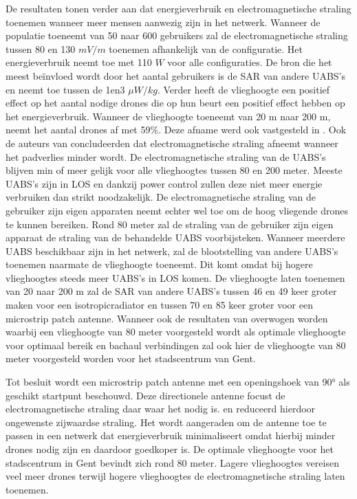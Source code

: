 \documentclass[twocolumn]{phdsymp_dutch}
\begin{document}
De resultaten tonen verder aan dat energieverbruik en electromagnetische straling toenemen wanneer 
meer mensen aanwezig zijn in het netwerk. Wanneer de populatie toeneemt van 50 naar 600 gebruikers 
zal de electromagnetische straling tussen 80 en 130 $mV/m$ toenemen afhankelijk van de configuratie.
Het energieverbruik neemt toe met 110 $W$ voor alle configuraties.
De bron die het meest be\"invloed wordt  door het aantal gebruikers is de \gls{SAR} van andere \gls{UABS}'s 
en neemt toe tussen de 1en3 $\mu W/kg$. 
Verder heeft de vlieghoogte een positief effect op het aantal nodige drones die op hun beurt een positief 
effect hebben op het energieverbruik. Wanneer de vlieghoogte toeneemt van 20 m naar 200 m, neemt het aantal 
drones af met 59\%. Deze afname werd ook vastgesteld in \cite{J2}.
Ook de auteurs van \cite{J17_kuehn2019modelling} concludeerden dat electromagnetische straling afneemt wanneer 
het padverlies minder wordt.
De electromagnetische straling van de  \gls{UABS}'s blijven min of meer gelijk voor alle vlieghoogtes tussen 80 en 200 meter. 
Meeste \gls{UABS}'s zijn in \gls{LOS} en dankzij power control zullen deze niet meer energie verbruiken dan strikt noodzakelijk.
De electromagnetische straling van de gebruiker zijn eigen apparaten neemt echter wel toe om de hoog vliegende drones te kunnen bereiken.
Rond 80 meter zal de straling van de gebruiker zijn eigen apparaat de straling van de behandelde \gls{UABS} voorbijsteken.
Wanneer meerdere \gls{UABS} beschikbaar zijn in het netwerk, zal de blootstelling van andere \gls{UABS}'s toenemen 
naarmate de vlieghoogte toeneemt. Dit komt omdat bij hogere vlieghoogtes steeds meer \gls{UABS}'s in \gls{LOS} komen.
De vlieghoogte laten toenemen van 20 naar 200 m zal de 
 \gls{SAR} van andere \gls{UABS}'s tussen 46 en 49 keer groter maken voor een \gls{isotropicradiator} en tussen
70 en 85 keer groter voor een microstrip patch antenne.
Wanneer ook de resultaten van \cite{U1} overwogen worden waarbij een vlieghoogte van 80 meter voorgesteld wordt als optimale 
vlieghoogte  voor optimaal bereik en bachaul verbindingen zal ook hier de vlieghoogte van 80 meter voorgesteld worden 
voor het stadscentrum van Gent.

Tot besluit wordt een microstrip patch antenne
met een openingshoek van \ang{90} als geschikt startpunt beschouwd.
Deze directionele  antenne focust de electromagnetische straling daar waar het nodig is.
en reduceerd hierdoor ongewenste zijwaardse straling.
Het wordt aangeraden om de antenne toe te passen in een netwerk dat energieverbruik minimaliseert
omdat hierbij minder drones nodig zijn en daardoor goedkoper is.
De optimale vlieghoogte voor het stadscentrum in Gent bevindt zich rond 80  meter.
Lagere vlieghoogtes vereisen veel meer drones terwijl hogere vlieghoogtes de 
electromagnetische straling laten toenemen.
\end{document}
